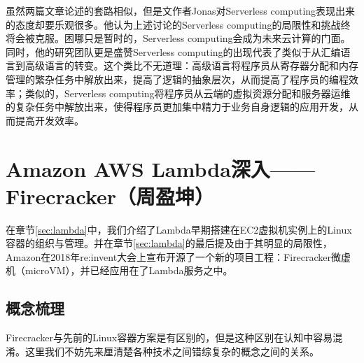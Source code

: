 \documentclass[11pt]{article}
\begin{document}
虽然两篇文章论述的套路相似，但是文作者Jonas对Serverless computing表现出来的态度却要乐观很多。他认为上述讨论的Serverless computing的局限性和挑战终将会被克服。困哪只是暂时的，Serverless computing会成为未来云计算的门面\cite{jonas2019cloud}。同时，他的研究团队更是盛赞Serverless computing的出现代表了类似于从汇编语言到高级语言的转变\cite{jonas2019cloud}。这个类比不无道理：高级语言将程序员从寄存器分配和内存管理的繁杂任务中解放出来，提高了逻辑的抽象层次，从而提高了程序员的编程效率；类似的，Serverless computing将程序员从云端的虚拟资源分配和服务器运维的复杂任务中解放出来，使得程序员更加集中精力于业务自身逻辑的应用开发，从而提高开发效率。

\section{Amazon AWS Lambda深入——Firecracker（周盈坤）}\label{sec:Firecracker}
在章节\ref{sec:lambda}中，我们介绍了Lambda早期搭建在EC2虚拟机实例上的Linux容器的组织与管理。并在章节\ref{sec:lambda}的最后提及由于其明显的局限性，Amazon在2018年re:invent大会上宣布开源了一个新的项目工程：Firecracker微虚机（microVM），并已经应用在了Lambda服务之中。

\subsection{概念梳理}
Firecracker与先前的Linux容器方案是有区别的，但是这种区别在认知中容易混淆。这里我们不妨先来厘清楚各种技术之间错综复杂的概念之间的关系。
\end{document}
